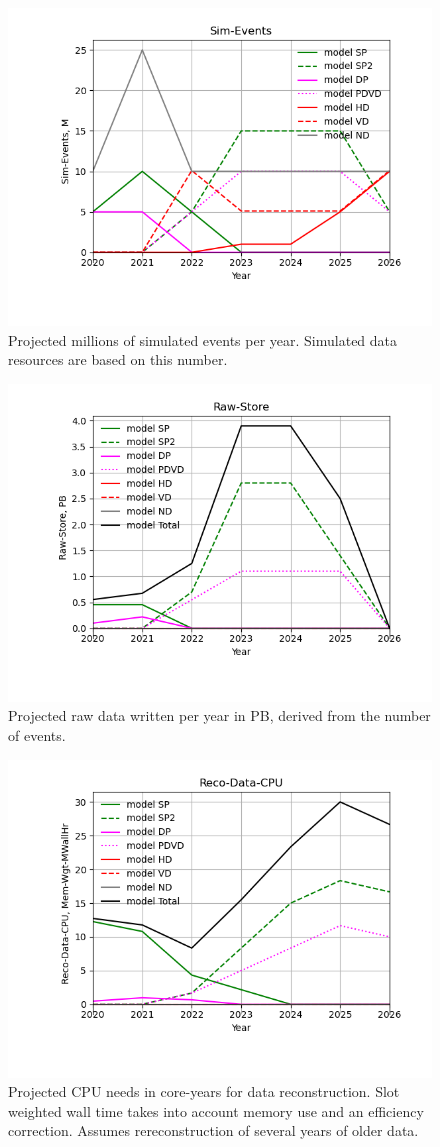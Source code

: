 \begin{figure}[h]
\centering\includegraphics[height=0.4\textwidth]{MoreSim_2022-11-21-2026/MoreSim_2022-11-21-2026-Sim-Events.png}
\caption{Projected millions of simulated events per year. Simulated data resources are based on this number. }
\label{fig:Sim-Events}
\end{figure}
\begin{figure}[h]
\centering\includegraphics[height=0.4\textwidth]{MoreSim_2022-11-21-2026/MoreSim_2022-11-21-2026-Raw-Store.png}
\caption{Projected raw data written per year in PB, derived from the number of events.}
\label{fig:Raw-Store}
\end{figure}
\begin{figure}[h]
\centering\includegraphics[height=0.4\textwidth]{MoreSim_2022-11-21-2026/MoreSim_2022-11-21-2026-Reco-Data-CPU.png}
\caption{Projected CPU needs in core-years for data reconstruction.              Slot weighted wall time takes into account memory use and an efficiency correction.  Assumes rereconstruction of several years of older data.}
\label{fig:Reco-Data-CPU}
\end{figure}
